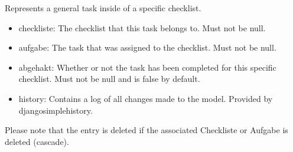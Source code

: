 \documentclass[letterpaper,10pt,english]{sphinxmanual}
\begin{document}
\begin{fulllineitems}
\label{\detokenize{masterCodeDoc:checklisten.models.ChecklisteAufgabe}}
Represents a general task inside of a specific checklist.
\begin{itemize}
\item {} 
checkliste: The checklist that this task belongs to. Must not be null.

\item {} 
aufgabe: The task that was assigned to the checklist. Must not be null.

\item {} 
abgehakt: Whether or not the task has been completed for this specific checklist. Must not be null and is false by default.

\item {} 
history: Contains a log of all changes made to the model. Provided by django\sphinxhyphen{}simple\sphinxhyphen{}history.

\end{itemize}

Please note that the entry is deleted if the associated Checkliste or Aufgabe is deleted (cascade).

\begin{fulllineitems}
\label{\detokenize{masterCodeDoc:checklisten.models.ChecklisteAufgabe.DoesNotExist}}
\end{fulllineitems}


\begin{fulllineitems}
\label{\detokenize{masterCodeDoc:checklisten.models.ChecklisteAufgabe.MultipleObjectsReturned}}
\end{fulllineitems}



\end{fulllineitems}
\end{document}
